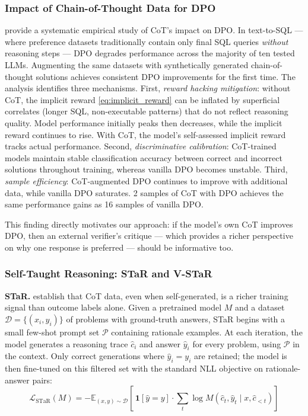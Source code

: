\subsubsection{Impact of Chain-of-Thought Data for DPO}
\label{sec:cot-dpo}

\autocite{gao2025uncoveringimpactchainofthought} provide a systematic empirical study of CoT's impact on DPO. In text-to-SQL --- where preference datasets traditionally contain only final SQL queries \textit{without} reasoning steps --- DPO degrades performance across the majority of ten tested LLMs. Augmenting the same datasets with synthetically generated chain-of-thought solutions achieves consistent DPO improvements for the first time. The analysis identifies three mechanisms. First, \textit{reward hacking mitigation}: without CoT, the implicit reward \eqref{eq:implicit_reward} can be inflated by superficial correlates (longer SQL, non-executable patterns) that do not reflect reasoning quality. Model performance initially peaks then decreases, while the implicit reward continues to rise. With CoT, the model's self-assessed implicit reward tracks actual performance. Second, \textit{discriminative calibration}: CoT-trained models maintain stable classification accuracy between correct and incorrect solutions throughout training, whereas vanilla DPO becomes unstable. Third, \textit{sample efficiency}: CoT-augmented DPO continues to improve with additional data, while vanilla DPO saturates. 2 samples of CoT with DPO achieves the same performance gains as 16 samples of vanilla DPO.

This finding directly motivates our approach: if the model's own CoT improves DPO, then an external verifier's critique --- which provides a richer perspective on why one response is preferred --- should be informative too.

\subsubsection{Self-Taught Reasoning: STaR and V-STaR}

\textbf{STaR.} \autocite{zelikman2022starbootstrappingreasoningreasoning} establish that CoT data, even when self-generated, is a richer training signal than outcome labels alone. Given a pretrained model $M$ and a dataset $\mathcal{D} = \{(x_i, y_i)\}$ of problems with ground-truth answers, STaR begins with a small few-shot prompt set $\mathcal{P}$ containing rationale examples. At each iteration, the model generates a reasoning trace $\hat{c}_i$ and answer $\hat{y}_i$ for every problem, using $\mathcal{P}$ in the context. Only correct generations where $\hat{y}_i = y_i$ are retained; the model is then fine-tuned on this filtered set with the standard NLL objective on rationale-answer pairs:
\begin{equation}
    \mathcal{L}_{\text{STaR}}(M) = -\mathbb{E}_{(x,y) \sim \mathcal{D}} \left[\,\mathbf{1}[\hat{y} = y]\cdot \sum_{t} \log M(\hat{c}_t, \hat{y}_t \mid x, \hat{c}_{<t})\right]
    \label{eq:star}
\end{equation}

